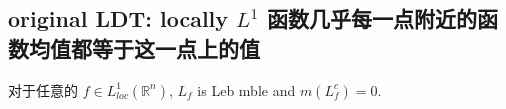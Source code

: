 \subsection{\texorpdfstring{original LDT: locally \(L^{1}\) 函数几乎每一点附近的函数均值都等于这一点上的值}{original LDT: locally L\^{}\{1\} 函数几乎每一点附近的函数均值都等于这一点上的值}}\label{original-ldt-locally-l1-ux51fdux6570ux51e0ux4e4eux6bcfux4e00ux70b9ux9644ux8fd1ux7684ux51fdux6570ux5747ux503cux90fdux7b49ux4e8eux8fd9ux4e00ux70b9ux4e0aux7684ux503c}

\begin{theorem}{}

对于任意的 \(f \in L_{loc}^{1}(\mathbb{R}^{n})\), \(L_{f}\) is Leb mble and \(m(L_{f}^{c}) = 0\).

\end{theorem}

